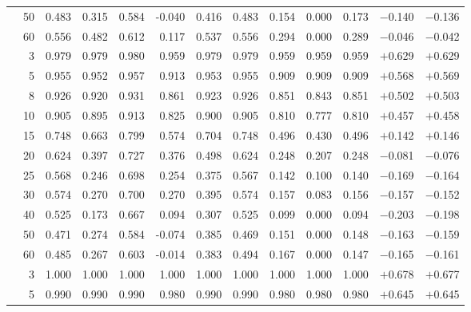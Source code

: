 \documentclass[conference]{IEEEtran}
\theoremstyle{remark}
\begin{document}
\begin{table}[ht]
{\begin{tabular}{p{2.2cm}r rrrr rr rr r rr}
  & 50 & 0.483 & 0.315 & 0.584 & -0.040 & 0.416 & 0.483 & 0.154 & 0.000 & 0.173 & $-$0.140 & $-$0.136 \\
  & 60 & 0.556 & 0.482 & 0.612 & 0.117 & 0.537 & 0.556 & 0.294 & 0.000 & 0.289 & $-$0.046 & $-$0.042 \\
\midrule
{}
  & 3  & 0.979 & 0.979 & 0.980 & 0.959 & 0.979 & 0.979 & 0.959 & 0.959 & 0.959 & $+$0.629 & $+$0.629 \\
  & 5  & 0.955 & 0.952 & 0.957 & 0.913 & 0.953 & 0.955 & 0.909 & 0.909 & 0.909 & $+$0.568 & $+$0.569 \\
  & 8  & 0.926 & 0.920 & 0.931 & 0.861 & 0.923 & 0.926 & 0.851 & 0.843 & 0.851 & $+$0.502 & $+$0.503 \\
  & 10 & 0.905 & 0.895 & 0.913 & 0.825 & 0.900 & 0.905 & 0.810 & 0.777 & 0.810 & $+$0.457 & $+$0.458 \\
  & 15 & 0.748 & 0.663 & 0.799 & 0.574 & 0.704 & 0.748 & 0.496 & 0.430 & 0.496 & $+$0.142 & $+$0.146 \\
  & 20 & 0.624 & 0.397 & 0.727 & 0.376 & 0.498 & 0.624 & 0.248 & 0.207 & 0.248 & $-$0.081 & $-$0.076 \\
  & 25 & 0.568 & 0.246 & 0.698 & 0.254 & 0.375 & 0.567 & 0.142 & 0.100 & 0.140 & $-$0.169 & $-$0.164 \\
  & 30 & 0.574 & 0.270 & 0.700 & 0.270 & 0.395 & 0.574 & 0.157 & 0.083 & 0.156 & $-$0.157 & $-$0.152 \\
  & 40 & 0.525 & 0.173 & 0.667 & 0.094 & 0.307 & 0.525 & 0.099 & 0.000 & 0.094 & $-$0.203 & $-$0.198 \\
  & 50 & 0.471 & 0.274 & 0.584 & -0.074 & 0.385 & 0.469 & 0.151 & 0.000 & 0.148 & $-$0.163 & $-$0.159 \\
  & 60 & 0.485 & 0.267 & 0.603 & -0.014 & 0.383 & 0.494 & 0.167 & 0.000 & 0.147 & $-$0.165 & $-$0.161 \\
\midrule
{}
  & 3  & 1.000 & 1.000 & 1.000 & 1.000 & 1.000 & 1.000 & 1.000 & 1.000 & 1.000 & $+$0.678 & $+$0.677 \\
  & 5  & 0.990 & 0.990 & 0.990 & 0.980 & 0.990 & 0.990 & 0.980 & 0.980 & 0.980 & $+$0.645 & $+$0.645 \\

\end{tabular}}
\end{table}
\end{document}

